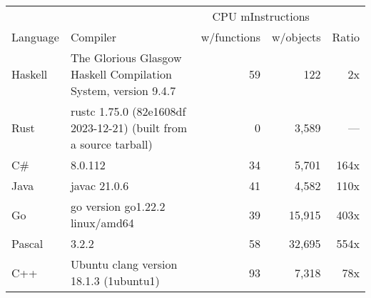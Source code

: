 \documentclass{article}
\begin{document}
      \begin{tabularx}{\linewidth}{lXrrr}
      \toprule
        & & \multicolumn{2}{c}{CPU mInstructions} & \\
        Language & Compiler & w/functions & w/objects & Ratio \\
      \midrule
    Haskell & The Glorious Glasgow Haskell Compilation System, version 9.4.7 & 59 & 122 & 2x \\
Rust & rustc 1.75.0 (82e1608df 2023-12-21) (built from a source tarball) & 0 & 3,589 & --- \\
C\# & 8.0.112 & 34 & 5,701 & 164x \\
Java & javac 21.0.6 & 41 & 4,582 & 110x \\
Go & go version go1.22.2 linux/amd64 & 39 & 15,915 & 403x \\
Pascal & 3.2.2 & 58 & 32,695 & 554x \\
C++ & Ubuntu clang version 18.1.3 (1ubuntu1) & 93 & 7,318 & 78x \\

      \bottomrule
      \end{tabularx}
      
\end{document}
